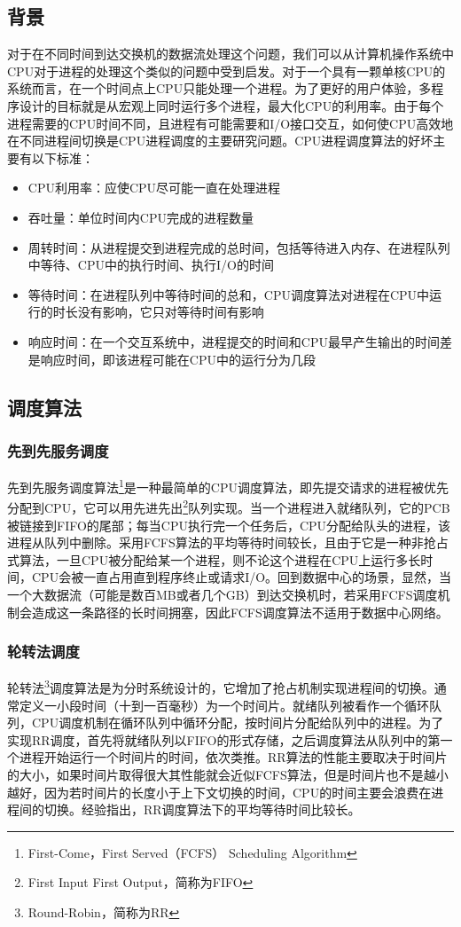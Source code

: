\subsection{背景}
对于在不同时间到达交换机的数据流处理这个问题，我们可以从计算机操作系统中CPU对于进程的处理这个类似的问题中受到启发。对于一个具有一颗单核CPU的系统而言，在一个时间点上CPU只能处理一个进程。为了更好的用户体验，多程序设计的目标就是从宏观上同时运行多个进程，最大化CPU的利用率。由于每个进程需要的CPU时间不同，且进程有可能需要和I/O接口交互，如何使CPU高效地在不同进程间切换是CPU进程调度的主要研究问题。CPU进程调度算法的好坏主要有以下标准：
\begin{itemize}
    \item CPU利用率：应使CPU尽可能一直在处理进程
    \item 吞吐量：单位时间内CPU完成的进程数量
    \item 周转时间：从进程提交到进程完成的总时间，包括等待进入内存、在进程队列中等待、CPU中的执行时间、执行I/O的时间
    \item 等待时间：在进程队列中等待时间的总和，CPU调度算法对进程在CPU中运行的时长没有影响，它只对等待时间有影响
    \item 响应时间：在一个交互系统中，进程提交的时间和CPU最早产生输出的时间差是响应时间，即该进程可能在CPU中的运行分为几段
\end{itemize}
\subsection{调度算法}
\subsubsection{先到先服务调度}
先到先服务调度算法\footnote{First-Come，First Served（FCFS） Scheduling Algorithm}是一种最简单的CPU调度算法，即先提交请求的进程被优先分配到CPU，它可以用先进先出\footnote{First Input First Output，简称为FIFO}队列实现。当一个进程进入就绪队列，它的PCB被链接到FIFO的尾部；每当CPU执行完一个任务后，CPU分配给队头的进程，该进程从队列中删除。采用FCFS算法的平均等待时间较长，且由于它是一种非抢占式算法，一旦CPU被分配给某一个进程，则不论这个进程在CPU上运行多长时间，CPU会被一直占用直到程序终止或请求I/O。回到数据中心的场景，显然，当一个大数据流（可能是数百MB或者几个GB）到达交换机时，若采用FCFS调度机制会造成这一条路径的长时间拥塞，因此FCFS调度算法不适用于数据中心网络。
\subsubsection{轮转法调度}
轮转法\footnote{Round-Robin，简称为RR}调度算法是为分时系统设计的，它增加了抢占机制实现进程间的切换。通常定义一小段时间（十到一百毫秒）为一个时间片。就绪队列被看作一个循环队列，CPU调度机制在循环队列中循环分配，按时间片分配给队列中的进程。为了实现RR调度，首先将就绪队列以FIFO的形式存储，之后调度算法从队列中的第一个进程开始运行一个时间片的时间，依次类推。RR算法的性能主要取决于时间片的大小，如果时间片取得很大其性能就会近似FCFS算法，但是时间片也不是越小越好，因为若时间片的长度小于上下文切换的时间，CPU的时间主要会浪费在进程间的切换。经验指出，RR调度算法下的平均等待时间比较长。
